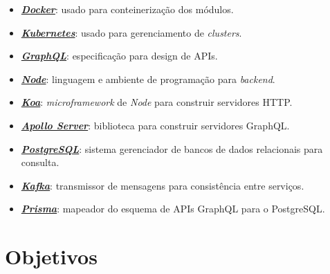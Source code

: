 \documentclass[10pt,twoside,a4paper]{article}
\begin{document}
    \begin{itemize}
        \item \href{https://www.docker.com/}{\textbf{\textit{Docker}}}: usado para conteinerização dos módulos.
        \item \href{https://kubernetes.io/}{\textbf{\textit{Kubernetes}}}: usado para gerenciamento de \textit{clusters}.
        \item \href{https://graphql.org/}{\textbf{\textit{GraphQL}}}: especificação para design de APIs.
        \item \href{https://nodejs.org/en/}{\textbf{\textit{Node}}}: linguagem e ambiente de programação para \textit{backend}.
        \item \href{https://koajs.com/}{\textbf{\textit{Koa}}}: \textit{microframework} de \textit{Node} para construir servidores HTTP.
        \item \href{https://www.apollographql.com/server}{\textbf{\textit{Apollo Server}}}: biblioteca para construir servidores GraphQL.
        \item \href{https://www.postgresql.org/}{\textbf{\textit{PostgreSQL}}}: sistema gerenciador de bancos de dados relacionais para consulta.
        \item \href{https://kafka.apache.org/}{\textbf{\textit{Kafka}}}: transmissor de mensagens para consistência entre serviços.
        \item \href{https://prisma.io/}{\textbf{\textit{Prisma}}}: mapeador do esquema de APIs GraphQL para o PostgreSQL.
    \end{itemize}
    

\section{Objetivos}
\end{document}
